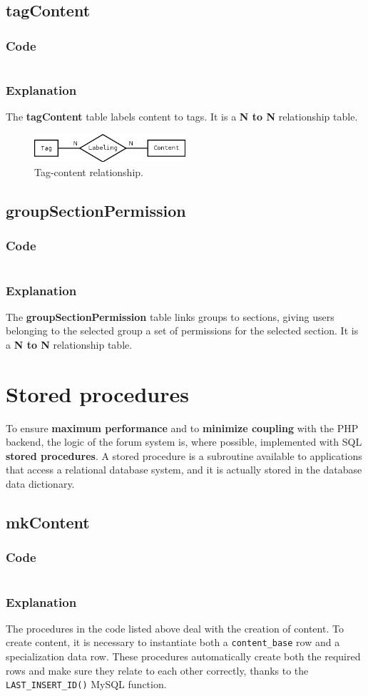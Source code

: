 \documentclass[12pt]{report}
\renewcommand\emph{\textbf}
\newcommand{\printSQLtest}[1]
{
    \inputminted[linenos, breaklines, breakbytoken, tabsize=4, fontsize=\footnotesize]{mysql}{#1}
}
\newcommand{\printSQLTablepage}[2]
{    
    \subsection{#2}
    \subsubsection{Code}
    \printSQLtest{../sql/parts/#1}
    \subsubsection{Explanation}
}
\begin{document}
                \newpage

                \printSQLTablepage{19_tblTagContent.sql}{tagContent}
                    The \emph{tagContent} table labels content to tags.
                    It is a \emph{N to N} relationship table.

                    \begin{figure}[!htb]
                    \caption{Tag-content relationship.}
                    \centering
                    \includegraphics[width=0.5\textwidth]{td/19tagcontent}
                    \end{figure}

                \newpage

                \printSQLTablepage{20_tblGroupSectionPermission.sql}{groupSectionPermission}
                    The \emph{groupSectionPermission} table links groups to sections, giving users belonging to the selected group a set of permissions for the selected section.
                    It is a \emph{N to N} relationship table.

                \newpage

            \section{Stored procedures}

                To ensure \emph{maximum performance} and to \emph{minimize coupling} with the PHP backend, the logic of the forum system is, where possible, implemented with SQL \emph{stored procedures}.
                A stored procedure is a subroutine available to applications that access a relational database system, and it is actually stored in the database data dictionary.

                \printSQLTablepage{21_procsMkContent.sql}{mkContent}
                    The procedures in the code listed above deal with the creation of content. To create content, it is necessary to instantiate both a \texttt{content_base} row and a specialization data row.
                    These procedures automatically create both the required rows and make sure they relate to each other correctly, thanks to the \texttt{LAST_INSERT_ID()} MySQL function.
\end{document}
